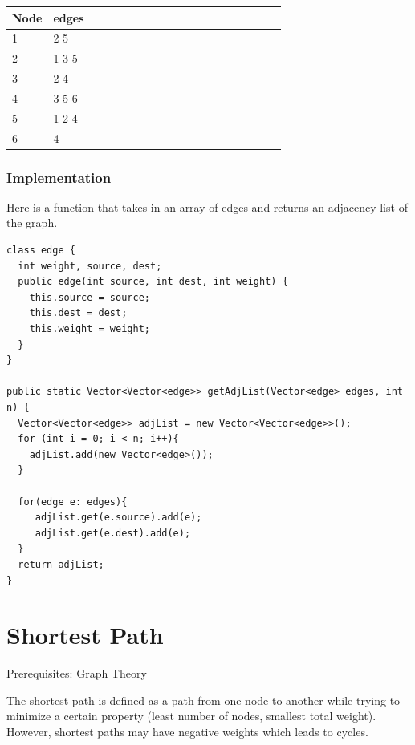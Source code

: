 \documentclass[11pt,oneside]{book}
\begin{document}
\begin{center}\begin{tabulary}{0.4\linewidth}{|l|l|l|l|l|l|l|l|l|l|l|l|l|l|l|l|l|l|l}\hline


  Node &
  edges\\
\hline


  1 &
  2 5\\

  2 &
  1 3 5\\

  3 &
  2 4\\

  4 &
  3 5 6\\

  5 &
  1 2 4\\

  6 &
  4\\

\hline\end{tabulary}\end{center}

\subsection{Implementation}

Here is a function that takes in an array of edges and returns an adjacency list of the graph.

\begin{lstlisting}
class edge {
  int weight, source, dest;
  public edge(int source, int dest, int weight) {
    this.source = source;
    this.dest = dest;
    this.weight = weight;
  }
}

public static Vector<Vector<edge>> getAdjList(Vector<edge> edges, int n) {
  Vector<Vector<edge>> adjList = new Vector<Vector<edge>>();
  for (int i = 0; i < n; i++){
    adjList.add(new Vector<edge>());
  }
  
  for(edge e: edges){
     adjList.get(e.source).add(e);
     adjList.get(e.dest).add(e);
  }
  return adjList;
}
\end{lstlisting}

    \chapter{ Shortest Path }
        

Prerequisites: Graph Theory

The shortest path is defined as a path from one node to another while trying to minimize a certain property (least number of nodes, smallest total weight). However, shortest paths may have negative weights which leads to cycles.
\end{document}
